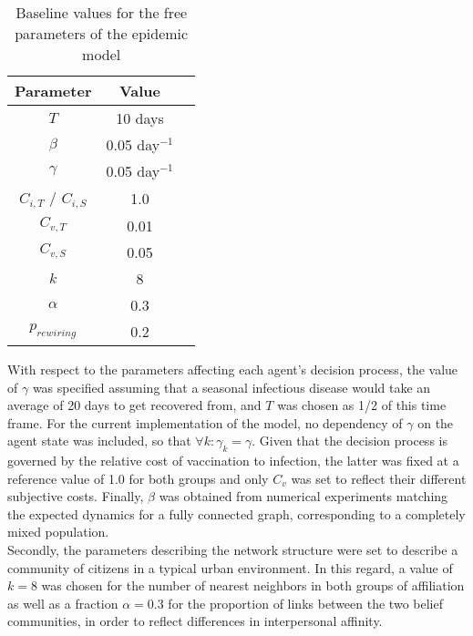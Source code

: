 \documentclass[11pt]{article}
\begin{document}
\begin{table}[htbp]
        \centering
        \begin{tabular}{|c|c|c|}
        \hline
                Parameter    &    Value       \\
        \hline
                 \(T\)       &    10 days        \\
        \hline
                 \(\beta\)   &    0.05 day\(^{-1}\)        \\
        \hline
                 \(\gamma\)   &    0.05  day\(^{-1}\)      \\
        \hline
                 \(C_{i,T}\) / \(C_{i,S}\) &    1.0    \\
        \hline
                 \(C_{v,T}\)  &    0.01       \\
        \hline
		 \(C_{v,S}\)  &    0.05       \\
        \hline
		 \(k\)  &    8      	      \\
        \hline
		 \(\alpha\)  &    0.3         \\
        \hline
		 \(p_{rewiring}\)  &    0.2   \\
        \hline
        \end{tabular}
        \caption{Baseline values for the free parameters of the epidemic model}
        \label{tab:Table1}
    \end{table}

With respect to the parameters affecting each agent's decision process, the value of \(\gamma\) was specified assuming that a seasonal infectious disease would take an average of 20 days to get recovered from, and \(T\) was chosen as 1/2 of this time frame. For the current implementation of the model, no dependency of \(\gamma\) on the agent state was included, so that \(\forall k : \gamma_{k} = \gamma\). Given that the decision process is governed by the relative cost of vaccination to infection, the latter was fixed at a reference value of 1.0 for both groups and only \(C_v\) was set to reflect their different subjective costs. Finally, \(\beta\) was obtained from numerical experiments matching the expected dynamics for a fully connected graph, corresponding to a completely mixed population.\\
Secondly, the parameters describing the network structure were set to describe a community of citizens in a typical urban environment. In this regard, a value of \(k = 8\) was chosen for the number of nearest neighbors in both groups of affiliation as well as a fraction \(\alpha = 0.3\) for the proportion of links between the two belief communities, in order to reflect differences in interpersonal affinity.
\end{document}
